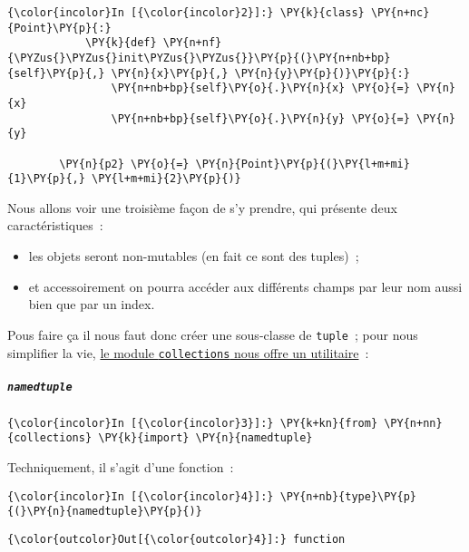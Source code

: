     \begin{Verbatim}[commandchars=\\\{\}]
{\color{incolor}In [{\color{incolor}2}]:} \PY{k}{class} \PY{n+nc}{Point}\PY{p}{:}
            \PY{k}{def} \PY{n+nf}{\PYZus{}\PYZus{}init\PYZus{}\PYZus{}}\PY{p}{(}\PY{n+nb+bp}{self}\PY{p}{,} \PY{n}{x}\PY{p}{,} \PY{n}{y}\PY{p}{)}\PY{p}{:}
                \PY{n+nb+bp}{self}\PY{o}{.}\PY{n}{x} \PY{o}{=} \PY{n}{x}
                \PY{n+nb+bp}{self}\PY{o}{.}\PY{n}{y} \PY{o}{=} \PY{n}{y}
        
        \PY{n}{p2} \PY{o}{=} \PY{n}{Point}\PY{p}{(}\PY{l+m+mi}{1}\PY{p}{,} \PY{l+m+mi}{2}\PY{p}{)}
\end{Verbatim}


    Nous allons voir une troisième façon de s'y prendre, qui présente deux
caractéristiques~:

\begin{itemize}
\tightlist
\item
  les objets seront non-mutables (en fait ce sont des tuples)~;
\item
  et accessoirement on pourra accéder aux différents champs par leur nom
  aussi bien que par un index.
\end{itemize}

    Pous faire ça il nous faut donc créer une sous-classe de
\texttt{tuple}~; pour nous simplifier la vie,
\href{https://docs.python.org/3/library/collections.html\#collections.namedtuple}{le
module \texttt{collections} nous offre un utilitaire}~:

    \hypertarget{namedtuple}{%
\subparagraph{\texorpdfstring{\texttt{namedtuple}}{namedtuple}}\label{namedtuple}}

    \begin{Verbatim}[commandchars=\\\{\}]
{\color{incolor}In [{\color{incolor}3}]:} \PY{k+kn}{from} \PY{n+nn}{collections} \PY{k}{import} \PY{n}{namedtuple}
\end{Verbatim}


    Techniquement, il s'agit d'une fonction~:

    \begin{Verbatim}[commandchars=\\\{\}]
{\color{incolor}In [{\color{incolor}4}]:} \PY{n+nb}{type}\PY{p}{(}\PY{n}{namedtuple}\PY{p}{)}
\end{Verbatim}


\begin{Verbatim}[commandchars=\\\{\}]
{\color{outcolor}Out[{\color{outcolor}4}]:} function
\end{Verbatim}
            
